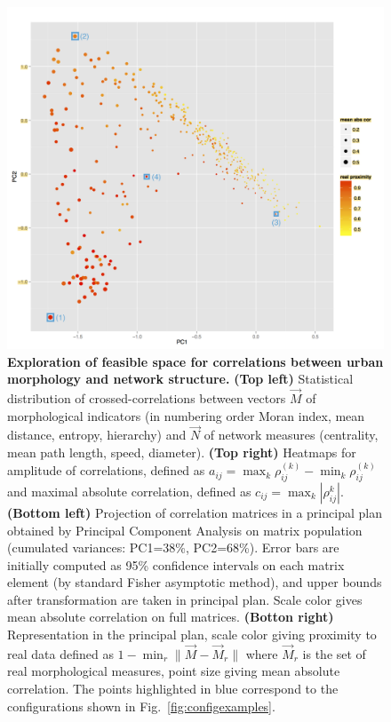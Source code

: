 \documentclass{article}
\newcommand{\norm}[1]{\| #1 \|}
\begin{document}
\begin{figure}[h!]
\begin{minipage}{0.45\linewidth}
\includegraphics[width=\textwidth]{pca_realDistCol_meanAbsCorSize_withSpecificPoints}
\end{minipage}
\caption{\textbf{Exploration of feasible space for correlations between urban morphology and network structure.} \textbf{(Top left)} Statistical distribution of crossed-correlations between vectors $\vec{M}$ of morphological indicators (in numbering order Moran index, mean distance, entropy, hierarchy) and $\vec{N}$ of network measures (centrality, mean path length, speed, diameter). \textbf{(Top right)} Heatmaps for amplitude of correlations, defined as $a_{ij}=\max_k{\rho_{ij}^{(k)}}-\min_k{\rho_{ij}^{(k)}}$ and maximal absolute correlation, defined as $c_{ij}=\max_k\left| \rho_{ij}^{k} \right|$. \textbf{(Bottom left)} Projection of correlation matrices in a principal plan obtained by Principal Component Analysis on matrix population (cumulated variances: PC1=38\%, PC2=68\%). Error bars are initially computed as 95\% confidence intervals on each matrix element (by standard Fisher asymptotic method), and upper bounds after transformation are taken in principal plan. Scale color gives mean absolute correlation on full matrices. \textbf{(Botton right)} Representation in the principal plan, scale color giving proximity to real data defined as $1 - \min_r \norm{\vec{M}-\vec{M}_r}$ where $\vec{M}_r$ is the set of real morphological measures, point size giving mean absolute correlation. The points highlighted in blue correspond to the configurations shown in Fig.~\ref{fig:configexamples}.\label{fig:densnwcor}}
\end{figure}
\end{document}
